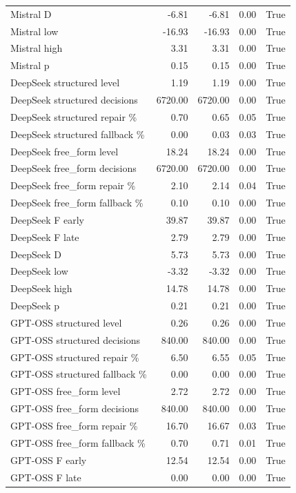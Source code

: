 \begin{longtable}{lrrrr}
Mistral D & -6.81 & -6.81 & 0.00 & True \\
Mistral low & -16.93 & -16.93 & 0.00 & True \\
Mistral high & 3.31 & 3.31 & 0.00 & True \\
Mistral p & 0.15 & 0.15 & 0.00 & True \\
DeepSeek structured level & 1.19 & 1.19 & 0.00 & True \\
DeepSeek structured decisions & 6720.00 & 6720.00 & 0.00 & True \\
DeepSeek structured repair \% & 0.70 & 0.65 & 0.05 & True \\
DeepSeek structured fallback \% & 0.00 & 0.03 & 0.03 & True \\
DeepSeek free\_form level & 18.24 & 18.24 & 0.00 & True \\
DeepSeek free\_form decisions & 6720.00 & 6720.00 & 0.00 & True \\
DeepSeek free\_form repair \% & 2.10 & 2.14 & 0.04 & True \\
DeepSeek free\_form fallback \% & 0.10 & 0.10 & 0.00 & True \\
DeepSeek F early & 39.87 & 39.87 & 0.00 & True \\
DeepSeek F late & 2.79 & 2.79 & 0.00 & True \\
DeepSeek D & 5.73 & 5.73 & 0.00 & True \\
DeepSeek low & -3.32 & -3.32 & 0.00 & True \\
DeepSeek high & 14.78 & 14.78 & 0.00 & True \\
DeepSeek p & 0.21 & 0.21 & 0.00 & True \\
GPT-OSS structured level & 0.26 & 0.26 & 0.00 & True \\
GPT-OSS structured decisions & 840.00 & 840.00 & 0.00 & True \\
GPT-OSS structured repair \% & 6.50 & 6.55 & 0.05 & True \\
GPT-OSS structured fallback \% & 0.00 & 0.00 & 0.00 & True \\
GPT-OSS free\_form level & 2.72 & 2.72 & 0.00 & True \\
GPT-OSS free\_form decisions & 840.00 & 840.00 & 0.00 & True \\
GPT-OSS free\_form repair \% & 16.70 & 16.67 & 0.03 & True \\
GPT-OSS free\_form fallback \% & 0.70 & 0.71 & 0.01 & True \\
GPT-OSS F early & 12.54 & 12.54 & 0.00 & True \\
GPT-OSS F late & 0.00 & 0.00 & 0.00 & True \\

\end{longtable}

